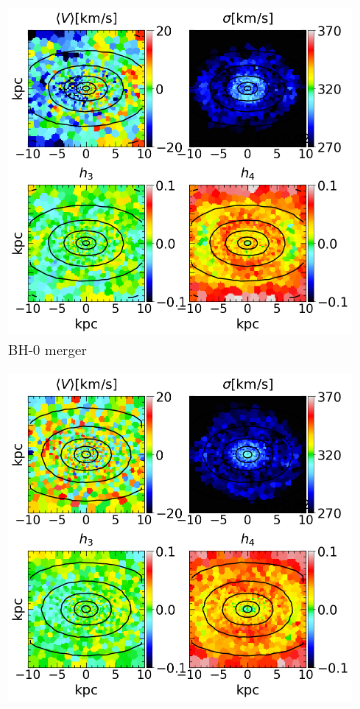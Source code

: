 \documentclass[english, oneside]{HYgradu}
\begin{document}
\begin{figure}
	\centering
	\begin{subfigure}[b]{0.49\textwidth}
		\includegraphics[width=\textwidth]{BH_1.png}
		\caption{BH-0 merger}
	\end{subfigure}
	\begin{subfigure}[b]{0.49\textwidth}
		\includegraphics[width=\textwidth]{BH_2.png}

\end{subfigure}
\end{figure}
\end{document}
